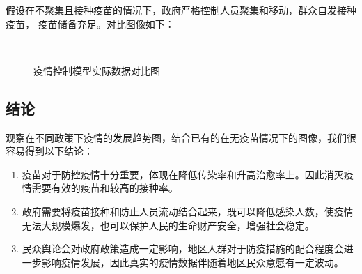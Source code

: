 \documentclass[withoutpreface,bwprint]{cumcmthesis} %
\begin{document}
\vspace{-0.5cm}
假设在不聚集且接种疫苗的情况下，政府严格控制人员聚集和移动，群众自发接种疫苗，
疫苗储备充足。对比图像如下：
\vspace{-0.4cm}
\begin{figure}[!htb]
    \centering
    \hfill
     \\
    \hfill
    \caption{疫情控制模型实际数据对比图}
\end{figure}

\clearpage
\subsection{结论}
观察在不同政策下疫情的发展趋势图，结合已有的在无疫苗情况下的图像，我们很容易得到以下结论：
\begin{enumerate}
    \item 疫苗对于防控疫情十分重要，体现在降低传染率和升高治愈率上。因此消灭疫情需要有效的疫苗和较高的接种率。
    \item 政府需要将疫苗接种和防止人员流动结合起来，既可以降低感染人数，使疫情无法大规模爆发，也可以保护人民的生命财产安全，增强社会稳定。
    \item 民众舆论会对政府政策造成一定影响，地区人群对于防疫措施的配合程度会进一步影响疫情发展，因此真实的疫情数据伴随着地区民众意愿有一定波动。
\end{enumerate}
\end{document}

